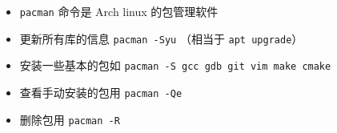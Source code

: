 
\begin{issues}
\issueDraft
\end{issues}

\begin{itemize}
\item \verb|pacman| 命令是 Arch linux 的包管理软件
\item 更新所有库的信息 \verb|pacman -Syu| （相当于 \verb|apt upgrade|）
\item 安装一些基本的包如 \verb|pacman -S gcc gdb git vim make cmake|
\item 查看手动安装的包用 \verb`pacman -Qe`
\item 删除包用 \verb`pacman -R `
\end{itemize}
